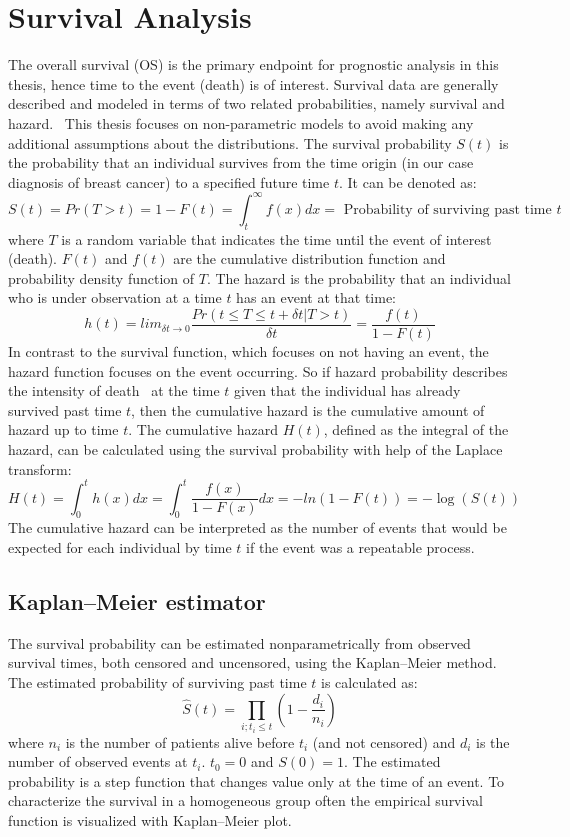 \section{Survival Analysis}
The overall survival (OS) is the primary endpoint for prognostic analysis in this thesis,
hence time to the event (death) is of interest. 
Survival data are generally described and modeled in terms of two related probabilities, namely survival and hazard.~\cite{clark2003survival}
This thesis focuses on non-parametric models to avoid making any additional assumptions about the distributions.
The survival probability $S(t)$ is the probability that an individual survives from the time origin (in our case diagnosis of breast cancer) to a specified future time $t$.
It can be denoted as: $$S(t) = Pr(T>t) = 1-F(t) = \int_t^\infty f(x) dx = \textrm{ Probability of surviving past time } t $$
where $T$ is a random variable that indicates the time until the event of interest (death). $F(t)$ and $f(t)$ are the cumulative distribution function
and probability density function of $T$. 
The hazard is the probability that an individual who is under observation at a time $t$ has an event at that time:
$$h(t) = lim_{\delta t \rightarrow 0}\frac{Pr(t \leq T \leq t + \delta t | T > t)}{\delta t} = \frac{f(t)}{1-F(t)}$$
In contrast to the survival function, which focuses on not having an event, the hazard function focuses on the event occurring. 
So if hazard probability describes the intensity of death~\cite{STAT_425} at the
time $t$ given that the individual has already survived past time $t$, then
the cumulative hazard is the cumulative amount of hazard up to time $t$.
The cumulative hazard $H(t)$, defined as the integral of the hazard,
can be calculated using the survival probability with help of the Laplace transform:
$$ H(t) = \int_0^t h(x) dx = \int_0^t \frac{f(x)}{1-F(x)} dx = - ln(1 - F(t)) = - \log (S(t)) $$
The cumulative hazard can be interpreted as the number of events that would be expected for each individual by time $t$ if the event was a repeatable process.~\cite{clark2003survival}

\subsection{Kaplan–Meier estimator}
The survival probability can be estimated nonparametrically from observed survival times,
both censored and uncensored, using the Kaplan–Meier method.
The estimated probability of surviving past time $t$ is calculated as:
$$\hat{S}(t) = \prod_{i; t_i \leq t} (1-\frac{d_i}{n_i})$$
where $n_i$ is the number of patients alive before $t_i$ (and not censored) and $d_i$ is the number of observed events at $t_i$. $t_0=0$ and $S(0)=1$.
The estimated probability is a step function that changes value only at the time of an event.
To characterize the survival in a homogeneous group often the empirical survival function is visualized with Kaplan–Meier plot.

